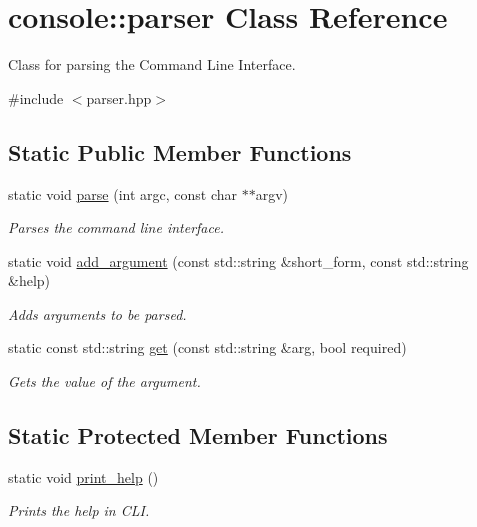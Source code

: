 \hypertarget{classconsole_1_1parser}{}\section{console\+:\+:parser Class Reference}
\label{classconsole_1_1parser}


Class for parsing the Command Line Interface.  




{\ttfamily \#include $<$parser.\+hpp$>$}

\subsection*{Static Public Member Functions}
\begin{DoxyCompactItemize}
\item 
\hypertarget{classconsole_1_1parser_ae579d789c0cc9b9b15bb7368ec54d703}{}static void \hyperlink{classconsole_1_1parser_ae579d789c0cc9b9b15bb7368ec54d703}{parse} (int argc, const char $\ast$$\ast$argv)\label{classconsole_1_1parser_ae579d789c0cc9b9b15bb7368ec54d703}

\begin{DoxyCompactList}\small\item\em Parses the command line interface. \end{DoxyCompactList}\item 
static void \hyperlink{classconsole_1_1parser_ab698f0297fcbdf6d52d32ad181c80f99}{add\+\_\+argument} (const std\+::string \&short\+\_\+form, const std\+::string \&help)
\begin{DoxyCompactList}\small\item\em Adds arguments to be parsed. \end{DoxyCompactList}\item 
static const std\+::string \hyperlink{classconsole_1_1parser_ac071bd86195d96a31cab5dad9c34aecd}{get} (const std\+::string \&arg, bool required)
\begin{DoxyCompactList}\small\item\em Gets the value of the argument. \end{DoxyCompactList}\end{DoxyCompactItemize}
\subsection*{Static Protected Member Functions}
\begin{DoxyCompactItemize}
\item 
\hypertarget{classconsole_1_1parser_a76801efa759b112e67960cbfd7fa9122}{}static void \hyperlink{classconsole_1_1parser_a76801efa759b112e67960cbfd7fa9122}{print\+\_\+help} ()\label{classconsole_1_1parser_a76801efa759b112e67960cbfd7fa9122}

\begin{DoxyCompactList}\small\item\em Prints the help in C\+L\+I. \end{DoxyCompactList}\end{DoxyCompactItemize}


